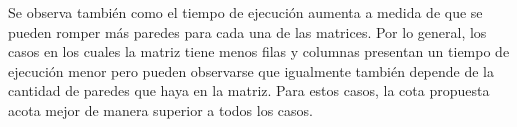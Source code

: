   Se observa también como el tiempo de ejecución aumenta a medida de que se pueden romper más paredes para cada una de las matrices. Por lo general, los casos en los cuales la matriz tiene menos filas y columnas presentan un tiempo de ejecución menor pero pueden observarse que igualmente también depende de la cantidad de paredes que haya en la matriz. Para estos casos, la cota propuesta acota mejor de manera superior a todos los casos.
